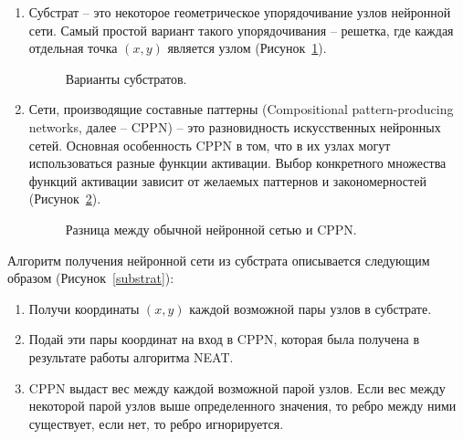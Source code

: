 \begin{enumerate}[label=\textbullet]
    \item Субстрат -- это некоторое геометрическое упорядочивание узлов нейронной сети. Самый простой вариант такого упорядочивания -- решетка, где каждая отдельная точка $(x,y)$ является узлом (Рисунок~\ref{SubstratConfig}). 
    
    \begin{figure}[ht]
        \begin{center}
    
            \caption{
                \label{SubstratConfig}
                Варианты субстратов.}
        \end {center}
    \end {figure}
    
    \item Сети, производящие составные паттерны (Compositional pattern-producing networks, далее – CPPN) -- это разновидность искусственных нейронных сетей. Основная особенность CPPN в том, что в их узлах могут использоваться разные функции активации. Выбор конкретного множества функций активации зависит от желаемых паттернов и закономерностей (Рисунок~\ref{CPPNvsANN}).
    \begin{figure}[ht]
        \begin{center}

            \caption{
                \label{CPPNvsANN}
                Разница между обычной нейронной сетью и CPPN.}
        \end {center}
    \end {figure}
\end{enumerate}



Алгоритм получения нейронной сети из субстрата описывается следующим образом (Рисунок~\ref{substrat}):

\begin{enumerate}
    \item Получи координаты $(x,y)$ каждой возможной пары узлов в субстрате.
    \item Подай эти пары координат на вход в CPPN, которая была получена в результате работы алгоритма NEAT.
    \item CPPN выдаст вес между каждой возможной парой узлов. Если вес между некоторой парой узлов выше определенного значения, то ребро между ними существует, если нет, то ребро игнорируется.
\end{enumerate}

